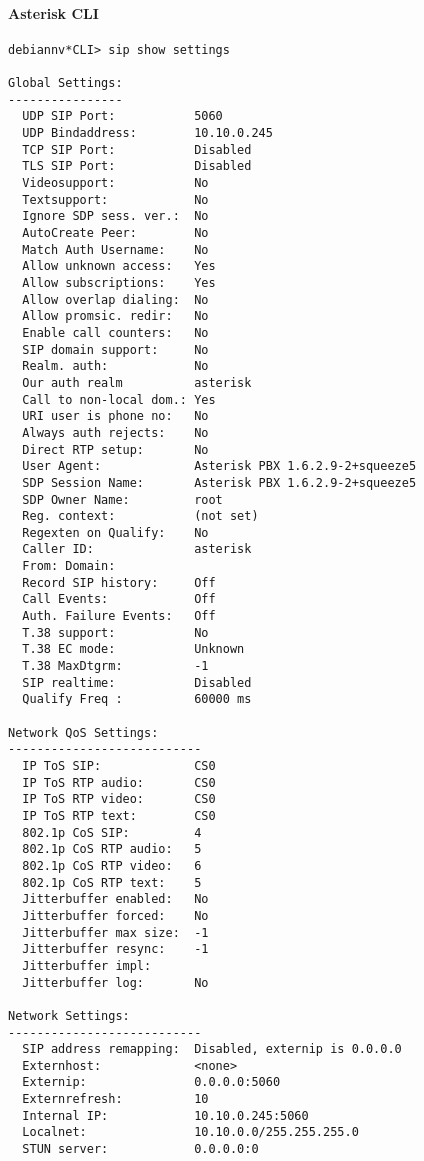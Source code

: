 \documentclass[a4paper,12pt]{report}
\newenvironment{myscriptlisting}
{\begin{list}{}{\setlength{\leftmargin}{1em}}\item\scriptsize\bfseries}
{\end{list}}
\begin{document}
\paragraph{Asterisk CLI}
\begin{myscriptlisting}
\begin{verbatim}
debiannv*CLI> sip show settings 

Global Settings:
----------------
  UDP SIP Port:           5060
  UDP Bindaddress:        10.10.0.245
  TCP SIP Port:           Disabled
  TLS SIP Port:           Disabled
  Videosupport:           No
  Textsupport:            No
  Ignore SDP sess. ver.:  No
  AutoCreate Peer:        No
  Match Auth Username:    No
  Allow unknown access:   Yes
  Allow subscriptions:    Yes
  Allow overlap dialing:  No
  Allow promsic. redir:   No
  Enable call counters:   No
  SIP domain support:     No
  Realm. auth:            No
  Our auth realm          asterisk
  Call to non-local dom.: Yes
  URI user is phone no:   No
  Always auth rejects:    No
  Direct RTP setup:       No
  User Agent:             Asterisk PBX 1.6.2.9-2+squeeze5
  SDP Session Name:       Asterisk PBX 1.6.2.9-2+squeeze5
  SDP Owner Name:         root
  Reg. context:           (not set)
  Regexten on Qualify:    No
  Caller ID:              asterisk
  From: Domain:           
  Record SIP history:     Off
  Call Events:            Off
  Auth. Failure Events:   Off
  T.38 support:           No
  T.38 EC mode:           Unknown
  T.38 MaxDtgrm:          -1
  SIP realtime:           Disabled
  Qualify Freq :          60000 ms

Network QoS Settings:
---------------------------
  IP ToS SIP:             CS0
  IP ToS RTP audio:       CS0
  IP ToS RTP video:       CS0
  IP ToS RTP text:        CS0
  802.1p CoS SIP:         4
  802.1p CoS RTP audio:   5
  802.1p CoS RTP video:   6
  802.1p CoS RTP text:    5
  Jitterbuffer enabled:   No
  Jitterbuffer forced:    No
  Jitterbuffer max size:  -1
  Jitterbuffer resync:    -1
  Jitterbuffer impl:      
  Jitterbuffer log:       No

Network Settings:
---------------------------
  SIP address remapping:  Disabled, externip is 0.0.0.0
  Externhost:             <none>
  Externip:               0.0.0.0:5060
  Externrefresh:          10
  Internal IP:            10.10.0.245:5060
  Localnet:               10.10.0.0/255.255.255.0
  STUN server:            0.0.0.0:0


\end{verbatim}
\end{myscriptlisting}
\end{document}
